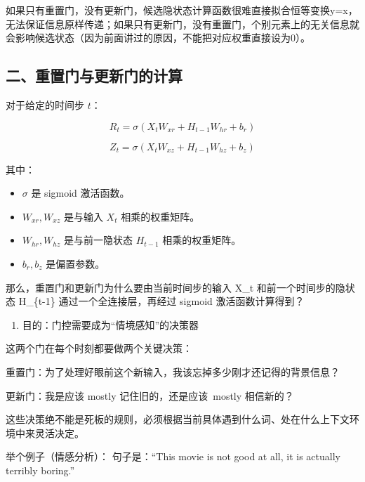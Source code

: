 如果只有重置门，没有更新门，候选隐状态计算函数很难直接拟合恒等变换y=x，无法保证信息原样传递；如果只有更新门，没有重置门，个别元素上的无关信息就会影响候选状态（因为前面讲过的原因，不能把对应权重直接设为0）。

\hypertarget{ux4e8cux91cdux7f6eux95e8ux4e0eux66f4ux65b0ux95e8ux7684ux8ba1ux7b97}{%
\subsection{二、重置门与更新门的计算}\label{ux4e8cux91cdux7f6eux95e8ux4e0eux66f4ux65b0ux95e8ux7684ux8ba1ux7b97}}

对于给定的时间步 \(t\)：

\[
R_t = \sigma(X_t W_{xr} + H_{t-1}W_{hr} + b_r)
\]

\[
Z_t = \sigma(X_t W_{xz} + H_{t-1}W_{hz} + b_z)
\]

其中：

\begin{itemize}
\tightlist
\item
  \(\sigma\) 是 sigmoid 激活函数。
\item
  \(W_{xr}, W_{xz}\) 是与输入 \(X_t\) 相乘的权重矩阵。
\item
  \(W_{hr}, W_{hz}\) 是与前一隐状态 \(H_{t-1}\) 相乘的权重矩阵。
\item
  \(b_r, b_z\) 是偏置参数。
\end{itemize}

那么，重置门和更新门为什么要由当前时间步的输入 X\_t 和前一个时间步的隐状态 H\_\{t-1\} 通过一个全连接层，再经过 sigmoid 激活函数计算得到？

\begin{enumerate}
\def\labelenumi{\arabic{enumi}.}
\tightlist
\item
  目的：门控需要成为``情境感知''的决策器
\end{enumerate}

这两个门在每个时刻都要做两个关键决策：

重置门：为了处理好眼前这个新输入，我该忘掉多少刚才还记得的背景信息？

更新门：我是应该 mostly 记住旧的，还是应该~mostly 相信新的？

这些决策绝不能是死板的规则，必须根据当前具体遇到什么词、处在什么上下文环境中来灵活决定。

举个例子（情感分析）：
句子是：``This movie is not good at all, it is actually terribly boring.''


